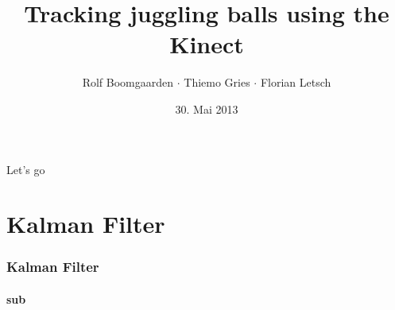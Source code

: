 \documentclass{beamer}
\title{Tracking juggling balls using the Kinect}
\author[Flo Rolf Thiemo]{Rolf Boomgaarden $\cdot$ Thiemo Gries $\cdot$ Florian Letsch}
\institute{Universität Hamburg}
\date{30. Mai 2013}
\begin{document}
\frame
{
\titlepage
}

\frame
{
\tableofcontents
}

\section{}

\begin{frame}{Let's go}
   
\end{frame}

\section{Kalman Filter}

\begin{frame}
\frametitle{Kalman Filter}
\framesubtitle{sub}

\end{frame}
\end{document}

